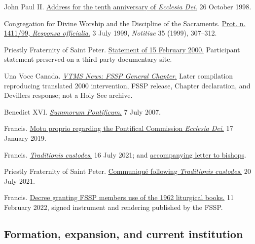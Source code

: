 John Paul II. \href{https://www.vatican.va/content/john-paul-ii/en/speeches/1998/october/documents/hf_jp-ii_spe_19981026_beatif.html}{Address for the tenth anniversary of \emph{Ecclesia Dei}.} 26 October 1998.

Congregation for Divine Worship and the Discipline of the Sacraments. \href{https://www.cultodivino.va/content/dam/cultodivino/rivista-notitiae/1990/notitiae-35-\%281999\%29/Notitiae-396-397-1999.pdf}{Prot. n. 1411/99, \emph{Responsa officialia}.} 3 July 1999, \emph{Notitiae} 35 (1999), 307--312.

Priestly Fraternity of Saint Peter. \href{https://www.ecclesiadei.nl/docs/fsspverklaring2.html}{Statement of 15 February 2000.} Participant statement preserved on a third-party documentary site.

Una Voce Canada. \href{https://unavocecanada.org/wp-content/uploads/2016/09/VTMS-News-FSSP-General-Chapter.pdf}{\emph{VTMS News: FSSP General Chapter}.} Later compilation reproducing translated 2000 intervention, FSSP release, Chapter declaration, and Devillers response; not a Holy See archive.

Benedict XVI. \href{https://www.vatican.va/content/benedict-xvi/en/motu_proprio/documents/hf_ben-xvi_motu-proprio_20070707_summorum-pontificum.html}{\emph{Summorum Pontificum}.} 7 July 2007.

Francis. \href{https://www.vatican.va/content/francesco/en/motu_proprio/documents/papa-francesco-motu-proprio-20190117_ecclesia-dei.html}{Motu proprio regarding the Pontifical Commission \emph{Ecclesia Dei}.} 17 January 2019.

Francis. \href{https://www.vatican.va/content/francesco/en/motu_proprio/documents/20210716-motu-proprio-traditionis-custodes.html}{\emph{Traditionis custodes}.} 16 July 2021; and \href{https://www.vatican.va/content/francesco/en/letters/2021/documents/20210716-lettera-vescovi-liturgia.html}{accompanying letter to bishops}.

Priestly Fraternity of Saint Peter. \href{https://www.fssp.org/en/official-communique-following-the-publication-of-the-motu-proprio-traditionis-custodes/}{Communiqué following \emph{Traditionis custodes}.} 20 July 2021.

Francis. \href{https://www.fssp.org/en/decree-of-pope-francis-confirming-the-use-of-the-1962-liturgical-books/}{Decree granting FSSP members use of the 1962 liturgical books.} 11 February 2022, signed instrument and rendering published by the FSSP.

\subsection{Formation, expansion, and current institution}

